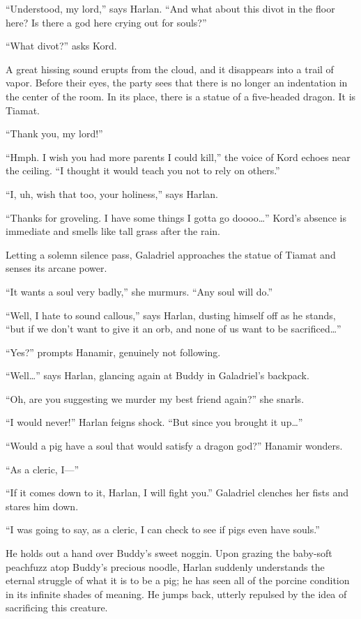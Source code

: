 \documentclass[smalldemyvopaper,11pt,twoside,onecolumn,openright,extrafontsizes]{memoir}
\begin{document}
``Understood, my lord,'' says Harlan. ``And what about this divot in the
floor here? Is there a god here crying out for souls?''

``What divot?'' asks Kord.

A great hissing sound erupts from the cloud, and it disappears into a
trail of vapor. Before their eyes, the party sees that there is no
longer an indentation in the center of the room. In its place, there is
a statue of a five-headed dragon. It is Tiamat.

``Thank you, my lord!''

``Hmph. I wish you had more parents I could kill,'' the voice of Kord
echoes near the ceiling. ``I thought it would teach you not to rely on
others.''

``I, uh, wish that too, your holiness,'' says Harlan.

``Thanks for groveling. I have some things I gotta go doooo\ldots{}''
Kord's absence is immediate and smells like tall grass after the rain.

Letting a solemn silence pass, Galadriel approaches the statue of Tiamat
and senses its arcane power.

``It wants a soul very badly,'' she murmurs. ``Any soul will do.''

``Well, I hate to sound callous,'' says Harlan, dusting himself off as
he stands, ``but if we don't want to give it an orb, and none of us want
to be sacrificed\ldots{}''

``Yes?'' prompts Hanamir, genuinely not following.

``Well\ldots{}'' says Harlan, glancing again at Buddy in Galadriel's
backpack.

``Oh, are you suggesting we murder my best friend again?'' she snarls.

``I would never!'' Harlan feigns shock. ``But since you brought it
up\ldots{}''

``Would a pig have a soul that would satisfy a dragon god?'' Hanamir
wonders.

``As a cleric, I---''

``If it comes down to it, Harlan, I will fight you.'' Galadriel clenches
her fists and stares him down.

``I was going to say, as a cleric, I can check to see if pigs even have
souls.''

He holds out a hand over Buddy's sweet noggin. Upon grazing the
baby-soft peachfuzz atop Buddy's precious noodle, Harlan suddenly
understands the eternal struggle of what it is to be a pig; he has seen
all of the porcine condition in its infinite shades of meaning. He jumps
back, utterly repulsed by the idea of sacrificing this creature.
\end{document}
